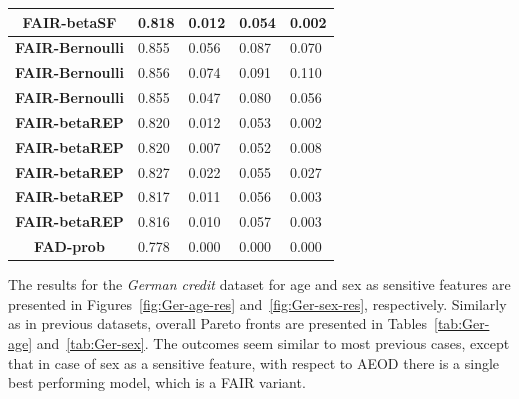 \documentclass[preprint,12pt]{elsarticle}
\begin{document}
\begin{table}
\begin{tabular}{|c|l|l|l|l|}
		\textbf{FAIR-betaSF}    & 0.818                             & 0.012                             & 0.054                             & 0.002                              \\ \hline
		\textbf{FAIR-Bernoulli} & 0.855                             & 0.056                             & 0.087                             & 0.070                              \\ \hline
		\textbf{FAIR-Bernoulli} & 0.856                             & 0.074                             & 0.091                             & 0.110                              \\ \hline
		\textbf{FAIR-Bernoulli} & 0.855                             & 0.047                             & 0.080                             & 0.056                              \\ \hline
		\textbf{FAIR-betaREP}   & 0.820                             & 0.012                             & 0.053                             & 0.002                              \\ \hline
		\textbf{FAIR-betaREP}   & 0.820                             & 0.007                             & 0.052                             & 0.008                              \\ \hline
		\textbf{FAIR-betaREP}   & 0.827                             & 0.022                             & 0.055                             & 0.027                              \\ \hline
		\textbf{FAIR-betaREP}   & 0.817                             & 0.011                             & 0.056                             & 0.003                              \\ \hline
		\textbf{FAIR-betaREP}   & 0.816                             & 0.010                             & 0.057                             & 0.003                              \\ \hline
		\textbf{FAD-prob}       & 0.778                             & 0.000                             & 0.000                             & 0.000                              \\ \hline
	\end{tabular}
	\label{tab:MEPS-19}%
\end{table}

The results for the \textit{German credit} dataset for age and sex as sensitive features are presented in Figures~\ref{fig:Ger-age-res} and~\ref{fig:Ger-sex-res}, respectively. Similarly as in previous datasets, overall Pareto fronts are presented in Tables~\ref{tab:Ger-age} and~\ref{tab:Ger-sex}. The outcomes seem similar to most previous cases,
except that in case of sex as a sensitive feature, with respect to AEOD there is a single best performing model, which is a FAIR variant.
\end{document}
